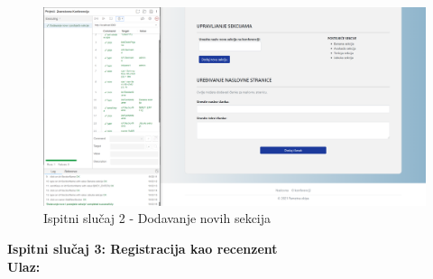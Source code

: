 			   \begin{figure}[H]
			 	\includegraphics[width= 15 cm, height= 25 cm, keepaspectratio]{slike/test_dodavanje_sekcija.png} 
			 	\centering
			 	\caption{Ispitni slučaj 2 - Dodavanje novih sekcija}
			 	\label{fig:act5}
			 \end{figure}
			
			
			 \noindent \textbf{Ispitni slučaj 3: Registracija kao recenzent}\\
			  \textbf{Ulaz:}

